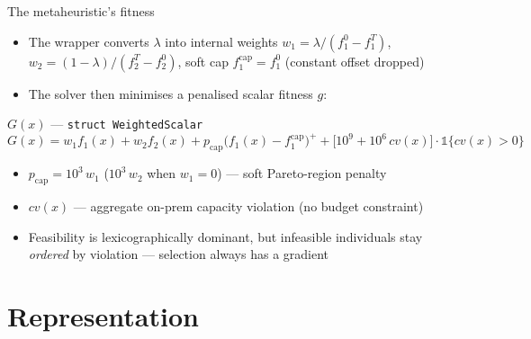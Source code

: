 \documentclass[aspectratio=169,t]{beamer}
\newcommand{\code}[1]{\texttt{#1}}
\newcommand{\g}{\ensuremath{g}\xspace}
\begin{document}
\begin{frame}{The metaheuristic's fitness}
  \begin{itemize}
    \item The wrapper converts $\lambda$ into internal weights
      $w_1 = \lambda/(f_1^{0}{-}f_1^{T})$, $w_2 = (1{-}\lambda)/(f_2^{T}{-}f_2^{0})$,
      soft cap $f_1^{\text{cap}} = f_1^{0}$ (constant offset dropped)
    \item The solver then minimises a \alert{penalised scalar fitness} \g:
  \end{itemize}
  \begin{block}{$G(x)$ --- \code{struct WeightedScalar}}
    \[
      G(x) = w_1 f_1(x) + w_2 f_2(x)
             + p_{\text{cap}} \big(f_1(x) - f_1^{\text{cap}}\big)^{+}
             + \big[10^{9} + 10^{6}\,cv(x)\big]\cdot \mathbb{1}\{cv(x) > 0\}
    \]
  \end{block}
  \begin{itemize}
    \item $p_{\text{cap}} = 10^{3}\,w_1$ ($10^{3}\,w_2$ when $w_1{=}0$) --- soft
      Pareto-region penalty
    \item $cv(x)$ --- aggregate on-prem capacity violation (no budget constraint)
    \item Feasibility is lexicographically dominant, but infeasible individuals
      stay \emph{ordered} by violation --- selection always has a gradient
  \end{itemize}
\end{frame}

\section{Representation}
\end{document}
